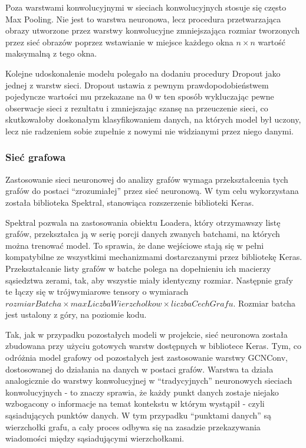 \documentclass{article}
\begin{document}
Poza warstwami konwolucyjnymi w sieciach konwolucyjnych stosuje się 
często Max Pooling. Nie jest to warstwa neuronowa, lecz procedura 
przetwarzająca obrazy utworzone przez warstwy konwolucyjne zmniejszająca 
rozmiar tworzonych przez sieć obrazów poprzez wstawianie w miejsce każdego 
okna $n \times n$ wartość maksymalną z tego okna.

Kolejne udoskonalenie modelu polegało na dodaniu procedury Dropout jako 
jednej z warstw sieci. Dropout ustawia z pewnym prawdopodobieństwem pojedyncze 
wartości mu przekazane na 0 w ten sposób wykluczając pewne obserwacje sieci z 
rezultatu i zmniejszając szansę na przeuczenie sieci, co skutkowałoby doskonałym 
klasyfikowaniem danych, na których model był uczony, lecz nie radzeniem sobie 
zupełnie z nowymi nie widzianymi przez niego danymi.
\subsubsection{Sieć grafowa}
Zastosowanie sieci neuronowej do analizy grafów wymaga przekształcenia
tych grafów do postaci “zrozumiałej” przez sieć neuronową. W tym celu
wykorzystana została biblioteka Spektral, stanowiąca rozszerzenie
biblioteki Keras.

Spektral pozwala na zastosowania obiektu Loadera, który otrzymawszy listę
grafów, przekształca ją w serię porcji danych zwanych batchami, na których
można trenować model. To sprawia, że dane wejściowe stają się w pełni
kompatybilne ze wszystkimi mechanizmami dostarczanymi przez bibliotekę
Keras.
Przekształcanie listy grafów w batche polega na dopełnieniu ich macierzy
sąsiedztwa zerami, tak, aby wszystie miały identyczny rozmiar.
Następnie grafy te łączy się w trójwymiarowe tensory o wymiarach
$rozmiarBatcha \times maxLiczbaWierzcholkow \times liczbaCechGrafu$. Rozmiar batcha
jest ustalony z góry, na poziomie kodu.

Tak, jak w przypadku pozostałych modeli w projekcie, sieć neuronowa została
zbudowana przy użyciu gotowych warstw dostępnych w bibliotece Keras. Tym, co
odróżnia model grafowy od pozostałych jest zastosowanie warstwy GCNConv,
dostosowanej do działania na danych w postaci grafów.
Warstwa ta działa analogicznie do warstwy konwolucyjnej w “tradycyjnych”
neuronowych sieciach konwolucyjnych - to znaczy sprawia, że każdy punkt
danych zostaje niejako wzbogacony o informacje na temat kontekstu w którym
wystąpił - czyli sąsiadujących punktów danych. W tym przypadku “punktami
danych” są wierzchołki grafu, a cały proces odbywa się na zasadzie przekazywania
wiadomości między sąsiadującymi wierzchołkami.
\end{document}
